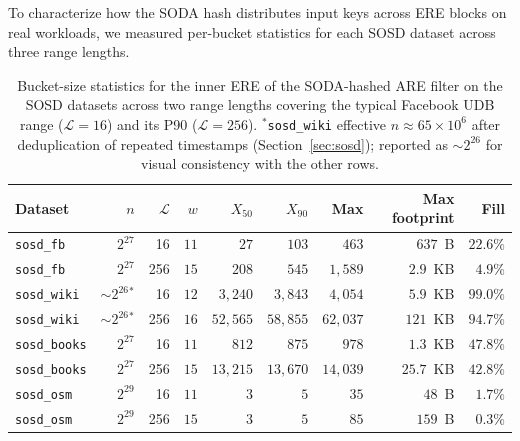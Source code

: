 To characterize how the SODA hash distributes input keys across ERE
blocks on real workloads, we measured per-bucket statistics for each
SOSD dataset across three range lengths.

\begin{table}[H]
    \centering
    \setlength{\tabcolsep}{9pt}
    \begin{tabular}{@{}lrrrrrrrr@{}}
        \toprule
        Dataset              & $n$                  & $\mathcal{L}$ & $w$  & $X_{50}$   & $X_{90}$   & Max        & Max footprint & Fill              \\
        \midrule
        \texttt{sosd\_fb}    & $2^{27}$             & 16            & $11$ & $27$       & $103$      & $463$      & $637$~B       & $22.6\%$          \\
        \texttt{sosd\_fb}    & $2^{27}$             & 256           & $15$ & $208$      & $545$      & $1{,}589$  & $2.9$~KB      & $4.9\%$           \\
        \texttt{sosd\_wiki}  & ${\sim}2^{26}{}^{*}$ & 16            & $12$ & $3{,}240$  & $3{,}843$  & $4{,}054$  & $5.9$~KB  & $\mathbf{99.0\%}$ \\
        \texttt{sosd\_wiki}  & ${\sim}2^{26}{}^{*}$ & 256           & $16$ & $52{,}565$ & $58{,}855$ & $62{,}037$   & $121$~KB   & $\mathbf{94.7\%}$ \\
        \texttt{sosd\_books} & $2^{27}$             & 16            & $11$ & $812$      & $875$      & $978$      & $1.3$~KB      & $47.8\%$          \\
        \texttt{sosd\_books} & $2^{27}$             & 256           & $15$ & $13{,}215$ & $13{,}670$ & $14{,}039$ & $25.7$~KB  & $42.8\%$ \\
        \texttt{sosd\_osm}   & $2^{29}$             & 16            & $11$ & $3$        & $5$        & $35$       & $48$~B        & $1.7\%$           \\
        \texttt{sosd\_osm}   & $2^{29}$             & 256           & $15$ & $3$        & $5$        & $85$       & $159$~B       & $0.3\%$           \\
        \bottomrule
    \end{tabular}
    \caption{Bucket-size statistics for the inner ERE of the SODA-hashed ARE
    filter on the SOSD datasets across two range lengths covering the
    typical Facebook UDB range ($\mathcal{L} = 16$) and its P90
        ($\mathcal{L} = 256$).
        $^{*}$\texttt{sosd\_wiki} effective $n \approx 65 \times 10^{6}$ after
        deduplication of repeated timestamps (Section~\ref{sec:sosd}); reported
        as ${\sim}2^{26}$ for visual consistency with the other rows.}
    \label{tab:eval-bucket-fill}


\end{table}
